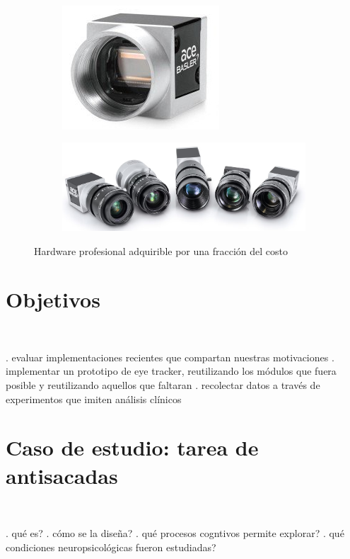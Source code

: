 \documentclass[aspectratio=169]{beamer}
\begin{document}
\begin{frame}{~}
  \begin{figure}
    \begin{subfigure}{0.49\textwidth}
      \centering
      \includegraphics[width=0.35\linewidth]{img/basler-camera.jpg}
    \end{subfigure}
    \begin{subfigure}{0.49\textwidth}
      \centering
      \includegraphics[width=0.6\linewidth]{img/basler-cameras-with-lens.png}
    \end{subfigure}
    \caption{Hardware profesional adquirible por una fracción del costo}
  \end{figure}

\end{frame}

\section{Objetivos}

\begin{frame}{~}

. evaluar implementaciones recientes que compartan nuestras motivaciones 
. implementar un prototipo de eye tracker, reutilizando los módulos que fuera
  posible y reutilizando aquellos que faltaran
. recolectar datos a través de experimentos que imiten análisis clínicos

\end{frame}

\section{Caso de estudio: tarea de antisacadas}

\begin{frame}{~}

. qué es?
. cómo se la diseña?
. qué procesos cogntivos permite explorar?
. qué condiciones neuropsicológicas fueron estudiadas?

\end{frame}
\end{document}
